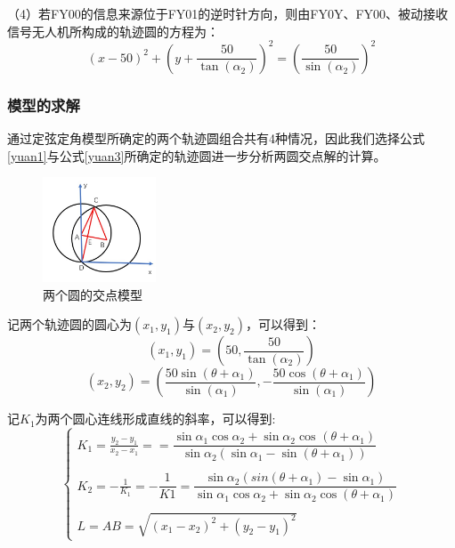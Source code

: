 \documentclass{my_paper}
\begin{document}
（4）若FY00的信息来源位于FY01的逆时针方向，则由FY0Y、FY00、被动接收信号无人机所构成的轨迹圆的方程为：
\begin{equation}
    (x - 50) ^{2} + (y + \frac{50}{\tan(\alpha_{2})}) ^ {2} = (\frac{50}{\sin(\alpha_2)}) ^ 2
    \label{yuan4}
\end{equation}


\subsubsection{模型的求解}
通过定弦定角模型所确定的两个轨迹圆组合共有4种情况，因此我们选择公式\ref{yuan1}与公式\ref{yuan3}所确定的轨迹圆进一步分析两圆交点解的计算。

\begin{figure}[h]
    \centering
    \includegraphics[width=0.3\textwidth]{images/liangyuan.jpg}
    \caption{两个圆的交点模型}
    \label{jiaodian}
\end{figure}

记两个轨迹圆的圆心为$(x_1,y_1)$与$(x_2,y_2)$，可以得到：
\begin{equation*}
    (x_1, y_1) = (50,\frac{50}{\tan(\alpha_2)})
\end{equation*}
\begin{equation*}
    (x_2, y_2) = (\frac{50\sin(\theta + \alpha_1)}{\sin(\alpha_1)}, - \frac{50\cos(\theta + \alpha_1)}{\sin(\alpha_1)})
\end{equation*}

记$K_1$为两个圆心连线形成直线的斜率，可以得到:
\begin{equation}
    \begin{cases}
        K_1 = \frac{y_2 - y_1} {x_2 - x_1} = =\dfrac{\sin \alpha_{1}\cos \alpha _{2}+\sin \alpha _{2}\cos _{}\left( \theta +\alpha _{1}\right) }{\sin \alpha _{2}\left( \sin \alpha_{1}-\sin \left( \theta +\alpha_{1}\right) \right) } \\
        \\
        K_2 = -\frac{1}{K_1} = -\dfrac{1}{K1}=\dfrac{\sin \alpha _{2}\left( sin\left( \theta +\alpha _{1}\right) -\sin \alpha _{1}\right) }{\sin \alpha_{1}\cos \alpha _{2}+\sin \alpha _{2}\cos \left( \theta +\alpha _{1}\right) }    \\
        \\
        L = AB = \sqrt{(x_1 - x_2) ^ 2 + (y_2 - y_1) ^ 2}
    \end{cases}
\end{equation}
\end{document}

